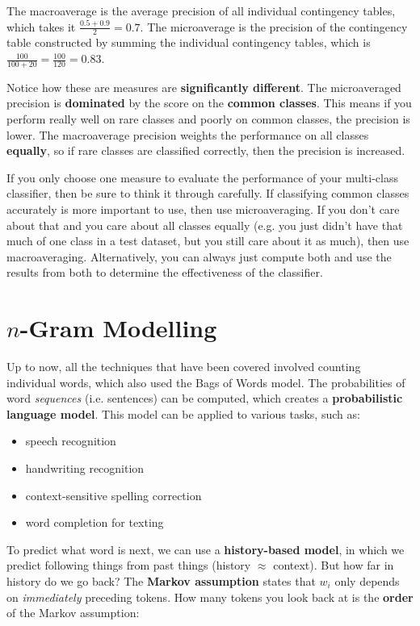 \documentclass{article}
\begin{document}
The macroaverage is the average precision of all individual contingency tables, which takes it $\frac{0.5 + 0.9}{2} = 0.7$. The microaverage is the precision of the contingency table constructed by summing the individual contingency tables, which is $\frac{100}{100 + 20} = \frac{100}{120} = 0.83$.

Notice how these are measures are \textbf{significantly different}. The microaveraged precision is \textbf{dominated} by the score on the \textbf{common classes}. This means if you perform really well on rare classes and poorly on common classes, the precision is lower. The macroaverage precision weights the performance on all classes \textbf{equally}, so if rare classes are classified correctly, then the precision is increased.

If you only choose one measure to evaluate the performance of your multi-class classifier, then be sure to think it through carefully. If classifying common classes accurately is more important to use, then use microaveraging. If you don't care about that and you care about all classes equally (e.g. you just didn't have that much of one class in a test dataset, but you still care about it as much), then use macroaveraging. Alternatively, you can always just compute both and use the results from both to determine the effectiveness of the classifier.

\section{$n$-Gram Modelling}
\label{sec:ngram-modelling}

Up to now, all the techniques that have been covered involved counting individual words, which also used the Bags of Words model. The probabilities of word \textit{sequences} (i.e. sentences) can be computed, which creates a \textbf{probabilistic language model}. This model can be applied to various tasks, such as:
\begin{itemize}
	\item speech recognition
	\item handwriting recognition
	\item context-sensitive spelling correction
	\item word completion for texting
\end{itemize}

To predict what word is next, we can use a \textbf{history-based model}, in which we predict following things from past things (history $\approx$ context).  But how far in history do we go back? The \textbf{Markov assumption} states that $w_i$ only depends on \textit{immediately} preceding tokens. How many tokens you look back at is the \textbf{order} of the Markov assumption:
\end{document}
